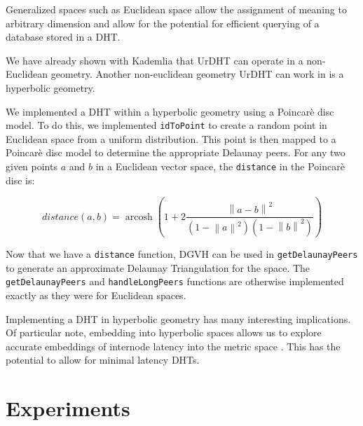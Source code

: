 Generalized spaces such as Euclidean space allow the assignment of meaning to arbitrary dimension and allow for the potential for efficient querying of a database stored in a DHT.

	
\label{sec:hyper}

We have already shown with Kademlia that UrDHT can operate in a non-Euclidean geometry.
Another non-euclidean geometry UrDHT can work in is a hyperbolic geometry.

We implemented a DHT within a hyperbolic geometry using a Poincar\`{e} disc model.
To do this, we implemented \texttt{idToPoint} to create a random point in Euclidean space from a uniform distribution.
This point is then mapped to a Poincar\`{e} disc model to determine the appropriate Delaunay peers.
For any two given points $a$ and $b$ in a Euclidean vector space, the \texttt{distance} in the  Poincar\`{e} disc is:


\[ distance(a, b) = \operatorname{arcosh} \left(  1+ 2 \frac{ \left\| a - b \right\| ^{2} }{ ( 1 - \left\| a \right\| ^{2} ) ( 1 - \left\| b \right\| ^{2} ) }\right) \]


Now that we have a \texttt{distance} function, DGVH can be used in \texttt{getDelaunayPeers} to generate an approximate Delaunay Triangulation for the space.
The \texttt{getDelaunayPeers} and \texttt{handleLongPeers} functions are otherwise implemented exactly as they were for Euclidean spaces. 




Implementing a DHT in hyperbolic geometry has many interesting implications.
Of particular note, embedding into hyperbolic spaces allows us to explore accurate embeddings of internode latency into the metric space \cite{kleinberg2007geographic} \cite{cvetkovski2009hyperbolic}.
This has the potential to allow for minimal latency DHTs.


%
%
%	
\section{Experiments}
\label{sec:experiments}

